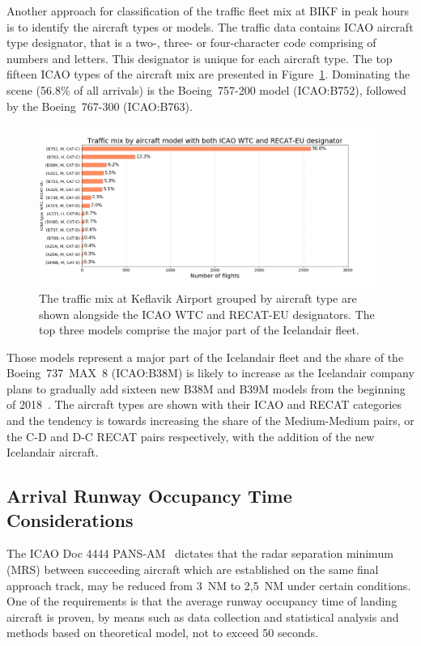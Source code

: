 Another approach for classification of the traffic fleet mix at BIKF in peak hours is to identify the aircraft types or models. The traffic data contains ICAO aircraft type designator, that is a two-, three- or four-character code comprising of numbers and letters. This designator is unique for each aircraft type. The top fifteen ICAO types of the aircraft mix are presented in Figure~\ref{fig:traffic_mix_by_model}. Dominating the scene (56.8\% of all arrivals) is the Boeing~757-200 model (ICAO:B752), followed by the Boeing~767-300 (ICAO:B763).
\begin{figure}[h]
    \centering
    \includegraphics[width=1\textwidth]{graphics/fig_traffic_mix_by_model.png}
    \caption[Traffic mix by aircraft model.]{The traffic mix at Keflavik Airport grouped by aircraft type are shown alongside the ICAO WTC and RECAT-EU designators. The top three models comprise the major part of the Icelandair fleet.}
    \label{fig:traffic_mix_by_model}
\end{figure}
 Those models represent a major part of the Icelandair fleet and the share of the Boeing~737~MAX~8 (ICAO:B38M) is likely to increase as the Icelandair company plans to gradually add sixteen new B38M and B39M models from the beginning of 2018~\cite{icelandair_fleet}. The aircraft types are shown with their ICAO and RECAT categories and the tendency is towards increasing the share of the Medium-Medium pairs, or the C-D and D-C RECAT pairs respectively, with the addition of the new Icelandair aircraft.


\subsection{Arrival Runway Occupancy Time Considerations}\label{ssec:AROT_considerations} 

The ICAO Doc 4444 PANS-AM~\cite{doc44444} dictates that the radar separation minimum (MRS) between succeeding aircraft which are established on the same final approach track, may be reduced from 3~NM to 2,5~NM under certain conditions. One of the requirements is that the average runway occupancy time of landing aircraft is proven, by means such as data collection and statistical analysis and methods based on theoretical model, not to exceed 50 seconds. 

